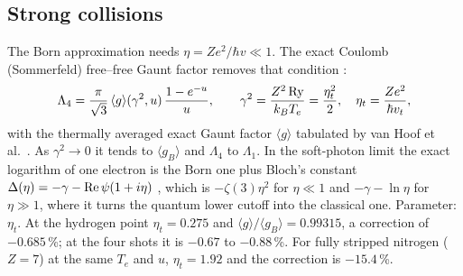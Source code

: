 \documentclass[11pt]{article}
\numberwithin{equation}{section}
\newcommand{\kB}{k_B}
\begin{document}
\subsection{Strong collisions}
\label{sec:strong}
The Born approximation needs $\eta=Ze^2/\hbar v\ll1$. The exact Coulomb (Sommerfeld)
free--free Gaunt factor removes that condition \cite{Sommerfeld1931,KarzasLatter1961}:
\begin{equation}
\Lambda_4=\frac{\pi}{\sqrt3}\,\langle g\rangle(\gamma^2,u)\,\frac{1-e^{-u}}{u},\qquad
\gamma^2=\frac{Z^2\,{\rm Ry}}{\kB T_e}=\frac{\eta_t^2}{2},\quad \eta_t=\frac{Ze^2}{\hbar v_t},
\label{eq:Lam4}
\end{equation}
with the thermally averaged exact Gaunt factor $\langle g\rangle$ tabulated by van Hoof et
al.\ \cite{vanHoof2014}. As $\gamma^2\to0$ it tends to $\langle g_B\rangle$ and $\Lambda_4$ to
$\Lambda_1$. In the soft-photon limit the exact logarithm of one electron is the Born one
plus Bloch's constant $\Delta(\eta)=-\gamma-{\rm Re}\,\psi(1+i\eta)$ \cite{Bloch1933}, which is
$-\zeta(3)\eta^2$ for $\eta\ll1$ and $-\gamma-\ln\eta$ for $\eta\gg1$, where it turns the
quantum lower cutoff into the classical one. Parameter: $\eta_t$. At the hydrogen point
$\eta_t=0.275$ and $\langle g\rangle/\langle g_B\rangle=0.99315$, a correction of
$-0.685$\,\%; at the four shots it is $-0.67$ to $-0.88$\,\%. For fully stripped nitrogen
($Z=7$) at the same $T_e$ and $u$, $\eta_t=1.92$ and the correction is $-15.4$\,\%.
\end{document}
